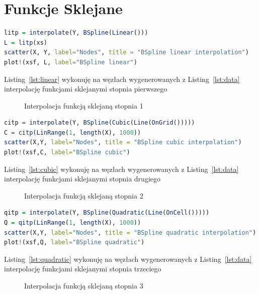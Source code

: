 \documentclass[12pt, a4paper]{article}
\begin{document}
\section{Funkcje Sklejane}
\begin{lstlisting}[caption={Interpolacja funkcją sklejaną stopnia 1},language=R,label={lst:linear}]
litp = interpolate(Y, BSpline(Linear()))
L = litp(xs)
scatter(X, Y, label="Nodes", title = "BSpline linear interpolation")
plot!(xsf, L, label="BSpline linear")
\end{lstlisting}
Listing~\ref{lst:linear} wykonuję na węzłach wygenerowanych z Listing~\ref{lst:data} interpolację funkcjami sklejanymi stopnia pierwszego
\begin{figure}[ht!]
	\centering    
	\def\svgwidth{\columnwidth}
	
	\caption{Interpolacja funkcją sklejaną stopnia 1}
	\label{fig:linear}
\end{figure}
\clearpage
\begin{lstlisting}[caption={Interpolacja funkcją sklejaną stopnia 2},language=R,label={lst:cubic}]
citp = interpolate(Y, BSpline(Cubic(Line(OnGrid()))))
C = citp(LinRange(1, length(X), 1000))
scatter(X,Y, label="Nodes", title = "BSpline cubic interpolation")
plot!(xsf,C, label="BSpline cubic")
\end{lstlisting}
Listing~\ref{lst:cubic} wykonuję na węzłach wygenerowanych z Listing~\ref{lst:data} interpolację funkcjami sklejanymi stopnia drugiego
\begin{figure}[ht!]
	\centering    
	\def\svgwidth{\columnwidth}
	
	\caption{Interpolacja funkcją sklejaną stopnia 2}
	\label{fig:cubic}
\end{figure}
\clearpage
\begin{lstlisting}[caption={Interpolacja funkcją sklejaną stopnia 3},language=R,label={lst:quadratic}]
qitp = interpolate(Y, BSpline(Quadratic(Line(OnCell()))))
Q = qitp(LinRange(1, length(X), 1000))
scatter(X,Y, label="Nodes", title = "BSpline quadratic interpolation")
plot!(xsf,Q, label="BSpline quadratic")
\end{lstlisting}
Listing~\ref{lst:quadratic} wykonuję na węzłach wygenerowanych z Listing~\ref{lst:data} interpolację funkcjami sklejanymi stopnia trzeciego
\begin{figure}[ht!]
	\centering    
	\def\svgwidth{\columnwidth}
	
	\caption{Interpolacja funkcją sklejaną stopnia 3}
	\label{fig:quadratic}
\end{figure}
\end{document}
